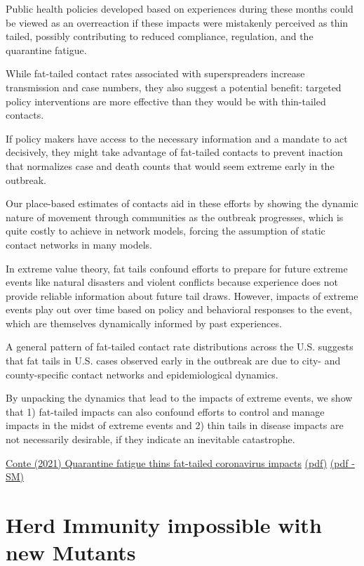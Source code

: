 \documentclass[
]{book}
\begin{document}
Public health policies developed based on experiences during these months
could be viewed as an overreaction if these impacts were
mistakenly perceived as thin tailed,
possibly contributing to reduced compliance, regulation, and the quarantine fatigue.

While fat-tailed contact rates associated with superspreaders increase transmission
and case numbers, they also suggest a potential benefit: targeted policy
interventions are more effective than they would be with thin-tailed contacts.

If policy makers have access to the necessary information and a mandate to act decisively,
they might take advantage of fat-tailed contacts
to prevent inaction that normalizes case and death counts that
would seem extreme early in the outbreak.

Our place-based estimates of contacts aid in these efforts by showing
the dynamic nature of movement through communities as the outbreak progresses,
which is quite costly to achieve in network models,
forcing the assumption of static contact networks in many models.

In extreme value theory, fat tails confound efforts to prepare for future extreme events
like natural disasters and violent conflicts because
experience does not provide reliable information about future tail draws.
However, impacts of extreme events play out over time based on policy and
behavioral responses to the event,
which are themselves dynamically informed by past experiences.

A general pattern of fat-tailed contact rate distributions across the U.S.
suggests that fat tails in U.S. cases observed early in the outbreak
are due to city- and county-specific contact networks and epidemiological dynamics.

By unpacking the dynamics that lead to the impacts of extreme events, we show that
1) fat-tailed impacts can also confound efforts to control and manage impacts
in the midst of extreme events and
2) thin tails in disease impacts are not necessarily desirable,
if they indicate an inevitable catastrophe.

\href{https://www.medrxiv.org/content/10.1101/2021.01.07.21249366v1}{Conte (2021) Quarantine fatigue thins fat-tailed coronavirus impacts}
\href{pdf/Conte_2021_Fat-tailed_Corona.pdf}{(pdf)}
\href{pdf/Conte_2021_Fat-tailed_Corona_SM.pdf}{(pdf - SM)}

\hypertarget{herd-immunity-impossible-with-new-mutants}{%
\section{Herd Immunity impossible with new Mutants}\label{herd-immunity-impossible-with-new-mutants}}
\end{document}
